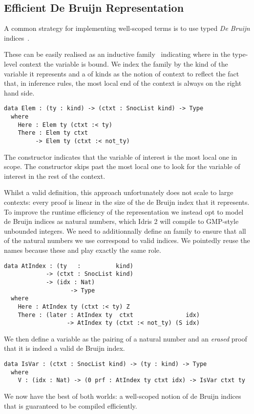 \subsection{Efficient De Bruijn Representation}
\label{sec:design:deBruijn}


A common strategy for implementing well-scoped terms is to use typed
\emph{De Bruijn} indices~\cite{MANUAL:journals/math/debruijn72}.

These can be easily realised as an inductive family~\cite{DBLP:journals/fac/Dybjer94}
indicating where in the type-level context the variable is bound.
%
We index the  family by the kind of the variable it represents and
a  of kinds as the notion of context to reflect the fact that,
in inference rules, the most local end of the context is always on the right hand side.

\begin{verbatim}
data Elem : (ty : kind) -> (ctxt : SnocList kind) -> Type
  where
    Here : Elem ty (ctxt :< ty)
    There : Elem ty ctxt
         -> Elem ty (ctxt :< not_ty)
\end{verbatim}

The  constructor indicates that the variable of interest is
the most local one in scope.
%
The  constructor skips past the most local one to look for
the variable of interest in the rest of the context.

Whilst a valid definition, this approach unfortunately does not scale to
large contexts: every  proof is linear in the size of the de Bruijn
index that it represents.
%
To improve the runtime efficiency of the representation we instead opt to
model de Bruijn indices as natural numbers, which Idris 2 will compile to
GMP-style unbounded integers.
%
We need to additionnally define an  family to ensure that
all of the natural numbers we use correspond to valid indices.%
%
We pointedly reuse the  names because these 
and  play exactly the same role.

\begin{verbatim}
data AtIndex : (ty   :          kind)
            -> (ctxt : SnocList kind)
            -> (idx : Nat)
                   -> Type
  where
    Here : AtIndex ty (ctxt :< ty) Z
    There : (later : AtIndex ty  ctxt               idx)
                  -> AtIndex ty (ctxt :< not_ty) (S idx)
\end{verbatim}

We then define a variable as the pairing of a natural number and an \emph{erased}
proof that it is indeed a valid de Bruijn index.

\begin{verbatim}
data IsVar : (ctxt : SnocList kind) -> (ty : kind) -> Type
  where
    V : (idx : Nat) -> (0 prf : AtIndex ty ctxt idx) -> IsVar ctxt ty
\end{verbatim}


We now have the best of both worlds: a well-scoped notion of de Bruijn indices
that is guaranteed to be compiled efficiently.

